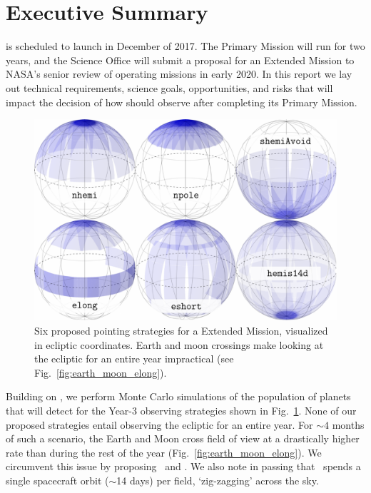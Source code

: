 \newpage
\section{Executive Summary}

\tess is scheduled to launch in December of 2017.
The Primary Mission will run for two years, and the \tess Science
Office will submit a proposal for an Extended Mission to NASA's senior
review of operating missions in early 2020.  In this report we lay out
technical requirements, science goals, opportunities, and risks that
will impact the decision of how \tess should observe after completing
its Primary Mission.

\begin{figure}[!b]
	\includegraphics{figures/proposed_pointings_texttt.pdf}
	\caption{Six proposed pointing strategies for a \tess Extended Mission, visualized in ecliptic coordinates.
	Earth and moon crossings make looking at the ecliptic for an entire year impractical (see Fig.~\protect\ref{fig:earth_moon_elong}).}
	\label{fig:strategies}
\end{figure}

Building on \citet{Sullivan_2015}, we perform Monte Carlo simulations of the population of planets that \tess will detect for the Year-3 observing strategies shown in Fig.~\ref{fig:strategies}.
None of our proposed strategies entail observing the ecliptic for an entire year.
For $\sim\!4$ months of such a scenario, the Earth and Moon cross \tesss field of view at a drastically higher rate than during the rest of the year (Fig.~\ref{fig:earth_moon_elong}).
We circumvent this issue by proposing \elong\ and \eshort.
We also note in passing that \hemis\ spends a single spacecraft orbit ($\sim$14 days) per field, `zig-zagging' across the sky.


